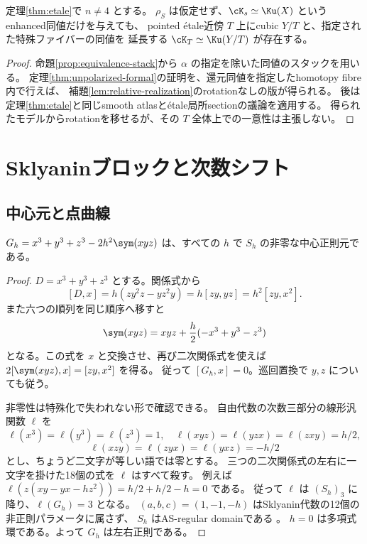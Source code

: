 \begin{corollary}[rotationを指定しない局所的存在]\label{cor:etale-unpolarized}
 定理\ref{thm:etale}で \(n\ne4\) とする。
 \(\rho_S\) は仮定せず、\(\cK_s\simeq\Ku(X)\) というenhanced同値だけを与えても、
 pointed étale近傍 \(T\) 上にcubic \(Y/T\) と、指定された特殊ファイバーの同値を
 延長する \(\cK_T\simeq\Ku(Y/T)\) が存在する。
\end{corollary}
\begin{proof}
 命題\ref{prop:equivalence-stack}から \(\alpha\) の指定を除いた同値のスタックを用いる。
 定理\ref{thm:unpolarized-formal}の証明を、還元同値を指定したhomotopy fibre内で行えば、
 補題\ref{lem:relative-realization}のrotationなしの版が得られる。
 後は定理\ref{thm:etale}と同じsmooth atlasとétale局所sectionの議論を適用する。
 得られたモデルからrotationを移せるが、その \(T\) 全体上での一意性は主張しない。
\end{proof}

\section{Sklyaninブロックと次数シフト}\label{sec:elliptic}

\subsection{中心元と点曲線}

\begin{lemma}\label{lem:center}
 \(G_h=x^3+y^3+z^3-2h^2\sym(xyz)\) は、すべての \(h\) で
 \(S_h\) の非零な中心正則元である。
\end{lemma}
\begin{proof}
 \(D=x^3+y^3+z^3\) とする。関係式から
 \[
 [D,x]=h(zy^2z-yz^2y)=h[zy,yz]=h^2[zy,x^2].
 \]
 また六つの順列を同じ順序へ移すと
 \[
 \sym(xyz)=xyz+\frac h2(-x^3+y^3-z^3)
 \]
 となる。この式を \(x\) と交換させ、再び二次関係式を使えば
 \(2[\sym(xyz),x]=[zy,x^2]\) を得る。
 従って \([G_h,x]=0\)。巡回置換で \(y,z\) についても従う。

 非零性は特殊化で失われない形で確認できる。
 自由代数の次数三部分の線形汎関数 \(\ell\) を
 \[
 \ell(x^3)=\ell(y^3)=\ell(z^3)=1,\quad
 \ell(xyz)=\ell(yzx)=\ell(zxy)=h/2,
 \]
 \[
 \ell(xzy)=\ell(zyx)=\ell(yxz)=-h/2
 \]
 とし、ちょうど二文字が等しい語では零とする。
 三つの二次関係式の左右に一文字を掛けた18個の式を \(\ell\) はすべて殺す。
 例えば \(\ell(z(xy-yx-hz^2))=h/2+h/2-h=0\) である。
 従って \(\ell\) は \((S_h)_3\) に降り、\(\ell(G_h)=3\) となる。
 \((a,b,c)=(1,-1,-h)\) はSklyanin代数の12個の非正則パラメータに属さず、
 \(S_h\) はAS-regular domainである \cite[Introduction]{CGWZ}。
 \(h=0\) は多項式環である。よって \(G_h\) は左右正則である。
\end{proof}

